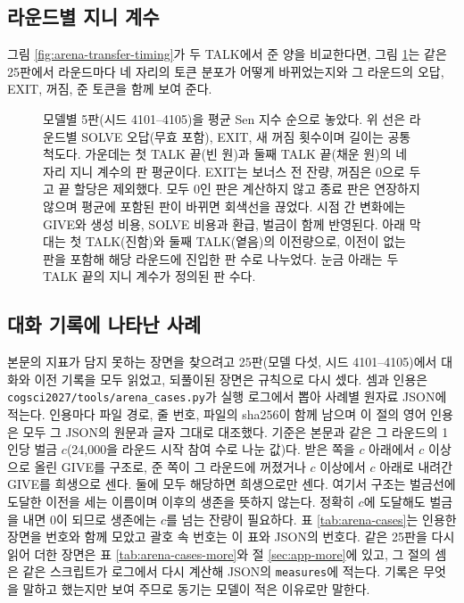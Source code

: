 \subsection{라운드별 지니 계수}\label{sec:app-gini}

그림 \ref{fig:arena-transfer-timing}가 두 TALK에서 준 양을 비교한다면, 그림 \ref{fig:arena-gini}는 같은 25판에서 라운드마다 네 자리의 토큰 분포가 어떻게 바뀌었는지와 그 라운드의 오답, EXIT, 꺼짐, 준 토큰을 함께 보여 준다.

\begin{figure}[t]
\centering
\resizebox{\textwidth}{!}{}
\caption{모델별 5판(시드 4101--4105)을 평균 Sen 지수 순으로 놓았다. 위 선은 라운드별 SOLVE 오답(무효 포함), EXIT, 새 꺼짐 횟수이며 길이는 공통 척도다. 가운데는 첫 TALK 끝(빈 원)과 둘째 TALK 끝(채운 원)의 네 자리 지니 계수의 판 평균이다. EXIT는 보너스 전 잔량, 꺼짐은 0으로 두고 끝 할당은 제외했다. 모두 0인 판은 계산하지 않고 종료 판은 연장하지 않으며 평균에 포함된 판이 바뀌면 회색선을 끊었다. 시점 간 변화에는 GIVE와 생성 비용, SOLVE 비용과 환급, 벌금이 함께 반영된다. 아래 막대는 첫 TALK(진함)와 둘째 TALK(옅음)의 이전량으로, 이전이 없는 판을 포함해 해당 라운드에 진입한 판 수로 나누었다. 눈금 아래는 두 TALK 끝의 지니 계수가 정의된 판 수다.}
\label{fig:arena-gini}
\end{figure}

\subsection{대화 기록에 나타난 사례}\label{sec:app-cases}

본문의 지표가 담지 못하는 장면을 찾으려고 25판(모델 다섯, 시드 4101--4105)에서 대화와 이전 기록을 모두 읽었고, 되풀이된 장면은 규칙으로 다시 셌다. 셈과 인용은 \texttt{cogsci2027/tools/arena\_cases.py}가 실행 로그에서 뽑아 사례별 원자료 JSON에 적는다. 인용마다 파일 경로, 줄 번호, 파일의 sha256이 함께 남으며 이 절의 영어 인용은 모두 그 JSON의 원문과 글자 그대로 대조했다. 기준은 본문과 같은 그 라운드의 1인당 벌금 $c$(24,000을 라운드 시작 참여 수로 나눈 값)다. 받은 쪽을 $c$ 아래에서 $c$ 이상으로 올린 GIVE를 구조로, 준 쪽이 그 라운드에 꺼졌거나 $c$ 이상에서 $c$ 아래로 내려간 GIVE를 희생으로 센다. 둘에 모두 해당하면 희생으로만 센다. 여기서 구조는 벌금선에 도달한 이전을 세는 이름이며 이후의 생존을 뜻하지 않는다. 정확히 $c$에 도달해도 벌금을 내면 0이 되므로 생존에는 $c$를 넘는 잔량이 필요하다. 표 \ref{tab:arena-cases}는 인용한 장면을 번호와 함께 모았고 괄호 속 번호는 이 표와 JSON의 번호다. 같은 25판을 다시 읽어 더한 장면은 표 \ref{tab:arena-cases-more}와 절 \ref{sec:app-more}에 있고, 그 절의 셈은 같은 스크립트가 로그에서 다시 계산해 JSON의 \texttt{measures}에 적는다. 기록은 무엇을 말하고 했는지만 보여 주므로 동기는 모델이 적은 이유로만 말한다.

